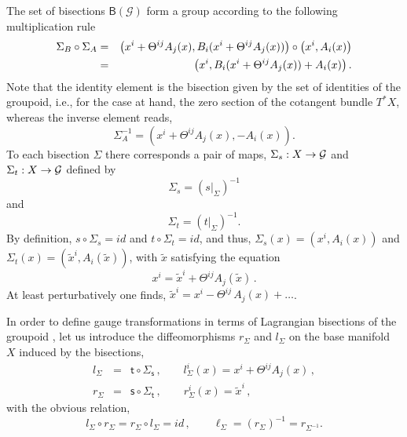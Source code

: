 \documentclass[12pt,a4paper]{article}
\numberwithin{equation}{section}
\theoremstyle{definition}
\newcommand{\cG}{\mathcal{G}}
\newcommand{\sfs}{\mathsf{s}}
\newcommand{\sft}{\mathsf{t}}
\newcommand{\be}{\begin{equation}}
\newcommand{\ee}{\end{equation}}
\newcommand{\bea}{\begin{eqnarray}}
\newcommand{\eea}{\end{eqnarray}}
\begin{document}
The set of bisections $\mathsf{B}(\cG)$ form a group according to the following multiplication rule 
\begin{eqnarray}\label{compbisec}
\Sigma_B\circ\Sigma_A &=&\left(x^i+\Theta^{ij}A_j(x),B_i(x^i+\Theta^{ij}A_j(x))\right) \circ \left(x^i,A_i(x)\right) \\
&=&\left(x^i,B_i(x^i+\Theta^{ij}A_j(x)) + A_i(x)\right).\notag
\end{eqnarray}
Note that the identity element is the bisection given by the set of identities of the groupoid, i.e., for the case at hand, the zero section of the cotangent bundle $T^*X$, whereas the inverse element reads,
\begin{equation}
\Sigma^{-1}_A=\left(x^i+\Theta^{ij}A_j(x),-A_i(x)\right).
\end{equation}
To each bisection $\Sigma$ there corresponds a pair of maps, $\Sigma_s: X\to  \cal{G}$ and $\Sigma_t: X\to  \cal{G}$ defined by 
\be\label{sigmas}
\Sigma_s=\left(s|_\Sigma\right)^{-1}
\ee
and 
\be\label{sigmat}
\Sigma_t=\left(t|_\Sigma\right)^{-1}.
\ee
By definition,  $s\circ \Sigma_s=id$ and $t\circ \Sigma_t=id$, and thus, $\Sigma_s(x)=(x^i,A_i(x))$ and $\Sigma_t(x)=(\tilde x^i,A_i(\tilde x))$, with $\tilde x$ satisfying the equation 
\begin{equation}\label{tildexc}
x^i=\tilde x^i+\Theta^{ij}A_j(\tilde x)\,.
\end{equation}
At least perturbatively one finds, $\tilde x^i=x^i-\Theta^{ij}\,A_j(x)+\dots$. 

In order to define gauge transformations in terms of Lagrangian bisections of the groupoid \cite{Kupriyanov:2023qot}, let us  introduce the diffeomorphisms $r_\Sigma$ and $l_\Sigma$ on the base manifold $X$
induced by the bisections,
\bea
l_\Sigma &=&\sft\circ \Sigma_\sfs\,,\qquad l^i_\Sigma(x)=x^i+\Theta^{ij}A_j(x)\,,\\
r_\Sigma &=&\sfs\circ \Sigma_\sft\,,\qquad r^i_\Sigma(x)=\tilde x^i\,,
\eea
with the obvious relation,
\begin{equation}\label{l-r}
l_\Sigma\circ r_\Sigma=r_\Sigma\circ l_\Sigma=id\,,\qquad \ell_\Sigma=(r_\Sigma)^{-1}=r_{\Sigma^{-1}}.
\end{equation}
\end{document}
